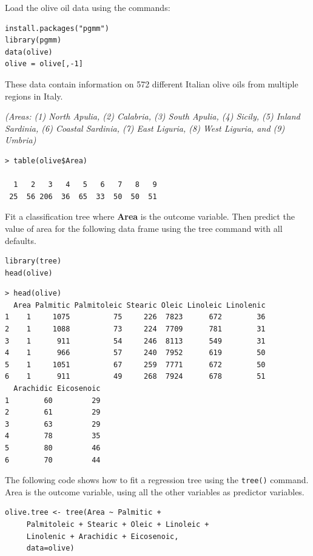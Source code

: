 \documentclass[caret-main.tex]{subfiles}
\begin{document}
Load the olive oil data using the commands:
\begin{framed}
\begin{verbatim}
install.packages("pgmm")
library(pgmm)
data(olive)
olive = olive[,-1]
\end{verbatim}
\end{framed}
\noindent These data contain information on 572 different Italian olive oils from multiple regions in Italy. 

\noindent \textit{(Areas: (1) North Apulia, (2) Calabria, (3) South Apulia, (4) Sicily, (5) Inland Sardinia, (6) Coastal Sardinia, (7) East Liguria, (8) West Liguria, and (9) Umbria)}
\begin{verbatim}
> table(olive$Area)

  1   2   3   4   5   6   7   8   9 
 25  56 206  36  65  33  50  50  51
\end{verbatim}
\noindent Fit a classification tree where \textbf{Area} is the outcome variable.
Then predict the value of area for the following data frame using the tree
command with all defaults.


\newpage
\begin{framed}
\begin{verbatim}
library(tree)
head(olive)
\end{verbatim}
\end{framed}
\begin{verbatim}
> head(olive)
  Area Palmitic Palmitoleic Stearic Oleic Linoleic Linolenic
1    1     1075          75     226  7823      672        36
2    1     1088          73     224  7709      781        31
3    1      911          54     246  8113      549        31
4    1      966          57     240  7952      619        50
5    1     1051          67     259  7771      672        50
6    1      911          49     268  7924      678        51
  Arachidic Eicosenoic
1        60         29
2        61         29
3        63         29
4        78         35
5        80         46
6        70         44
\end{verbatim}
The following code shows how to fit a regression tree using the \texttt{tree()} command. Area is the outcome variable, using all the other variables as predictor variables.
\begin{framed}
\begin{verbatim}
olive.tree <- tree(Area ~ Palmitic + 
     Palmitoleic + Stearic + Oleic + Linoleic + 
     Linolenic + Arachidic + Eicosenoic, 
     data=olive)
\end{verbatim}
\end{framed}
\end{document}
